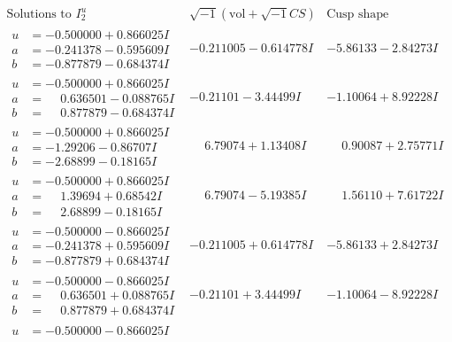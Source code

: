 \documentclass[1p]{elsarticle_modified}
\theoremstyle{definition}
\newcommand{\I}{\sqrt{-1}}
\begin{document}
$$\begin{array}{c|c|c}  
\text{Solutions to }I^u_{2}& \I (\text{vol} + \sqrt{-1}CS) & \text{Cusp shape}\\
 \hline 
\begin{aligned}
u &= -0.500000 + 0.866025 I \\
a &= -0.241378 - 0.595609 I \\
b &= -0.877879 - 0.684374 I\end{aligned}
 & -0.211005 - 0.614778 I & -5.86133 - 2.84273 I \\ \hline\begin{aligned}
u &= -0.500000 + 0.866025 I \\
a &= \phantom{-}0.636501 - 0.088765 I \\
b &= \phantom{-}0.877879 - 0.684374 I\end{aligned}
 & -0.21101 - 3.44499 I & -1.10064 + 8.92228 I \\ \hline\begin{aligned}
u &= -0.500000 + 0.866025 I \\
a &= -1.29206 - 0.86707 I \\
b &= -2.68899 - 0.18165 I\end{aligned}
 & \phantom{-}6.79074 + 1.13408 I & \phantom{-}0.90087 + 2.75771 I \\ \hline\begin{aligned}
u &= -0.500000 + 0.866025 I \\
a &= \phantom{-}1.39694 + 0.68542 I \\
b &= \phantom{-}2.68899 - 0.18165 I\end{aligned}
 & \phantom{-}6.79074 - 5.19385 I & \phantom{-}1.56110 + 7.61722 I \\ \hline\begin{aligned}
u &= -0.500000 - 0.866025 I \\
a &= -0.241378 + 0.595609 I \\
b &= -0.877879 + 0.684374 I\end{aligned}
 & -0.211005 + 0.614778 I & -5.86133 + 2.84273 I \\ \hline\begin{aligned}
u &= -0.500000 - 0.866025 I \\
a &= \phantom{-}0.636501 + 0.088765 I \\
b &= \phantom{-}0.877879 + 0.684374 I\end{aligned}
 & -0.21101 + 3.44499 I & -1.10064 - 8.92228 I \\ \hline\begin{aligned}
u &= -0.500000 - 0.866025 I \\

\end{aligned}
\end{array}$$
\end{document}
